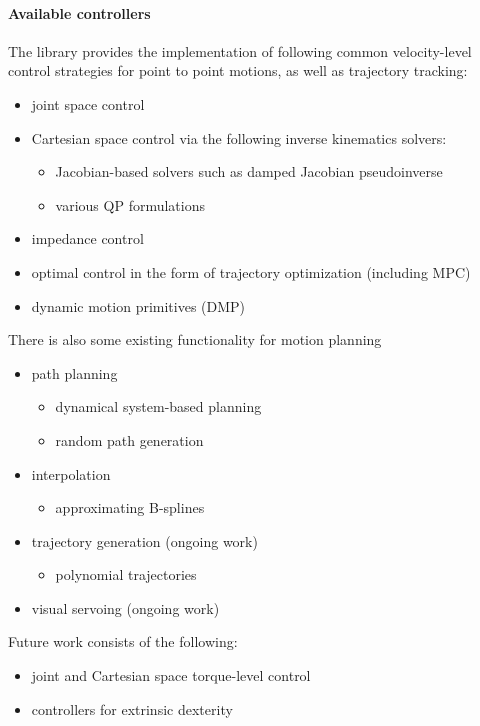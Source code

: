 \paragraph{Available controllers}
The library provides the implementation of following common 
velocity-level control strategies for point to
point motions, as well as trajectory tracking:
\begin{itemize}
\item joint space control
\item Cartesian space control via the following inverse kinematics solvers:
\begin{itemize}
	\item Jacobian-based solvers such as damped Jacobian pseudoinverse
	\item various QP formulations
\end{itemize} 
\item impedance control
\item optimal control in the form of trajectory optimization (including MPC)
\item dynamic motion primitives (DMP)
\end{itemize}
There is also some existing functionality for motion planning
\begin{itemize}
	\item path planning
\begin{itemize}
	\item dynamical system-based planning
	\item random path generation
\end{itemize} 
	\item interpolation
\begin{itemize}
	\item approximating B-splines
\end{itemize} 
	\item trajectory generation (ongoing work)
\begin{itemize}
	\item polynomial trajectories
\end{itemize} 
	\item visual servoing (ongoing work)
\end{itemize}

Future work consists of the following:
\begin{itemize}
	\item joint and Cartesian space torque-level control
\item controllers for extrinsic dexterity
\end{itemize}


